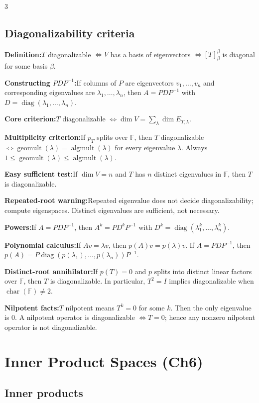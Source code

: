\documentclass[10pt]{article}
\newcommand{\F}{\mathbb{F}}
\newcommand{\diag}{\operatorname{diag}}
\newcommand{\algmult}{\operatorname{algmult}}
\newcommand{\geomult}{\operatorname{geomult}}
\newenvironment{cheatitems}{\par\vspace{-1pt}}{\par\vspace{-1pt}}
\newcommand{\cheatrow}[2]{%
  \par\noindent\textbf{#1:}\nobreak\enspace #2\par
}
\begin{document}
\begin{multicols}{3}
\subsection*{Diagonalizability criteria}
\begin{cheatitems}
\cheatrow{Definition}{$T$ diagonalizable $\iff V$ has a basis of eigenvectors $\iff [T]^\beta_\beta$ is diagonal for some basis $\beta$.}
\cheatrow{Constructing $PDP^{-1}$}{If columns of $P$ are eigenvectors $v_1,\dots,v_n$ and corresponding eigenvalues are $\lambda_1,\dots,\lambda_n$, then $A=PDP^{-1}$ with $D=\diag(\lambda_1,\dots,\lambda_n)$.}
\cheatrow{Core criterion}{$T$ diagonalizable $\iff \dim V=\sum_\lambda \dim E_{T,\lambda}$.}
\cheatrow{Multiplicity criterion}{If $p_T$ splits over $\F$, then $T$ diagonalizable $\iff \geomult(\lambda)=\algmult(\lambda)$ for every eigenvalue $\lambda$. Always $1\le \geomult(\lambda)\le \algmult(\lambda)$.}
\cheatrow{Easy sufficient test}{If $\dim V=n$ and $T$ has $n$ distinct eigenvalues in $\F$, then $T$ is diagonalizable.}
\cheatrow{Repeated-root warning}{Repeated eigenvalue does not decide diagonalizability; compute eigenspaces. Distinct eigenvalues are sufficient, not necessary.}
\cheatrow{Powers}{If $A=PDP^{-1}$, then $A^k=PD^kP^{-1}$ with $D^k=\diag(\lambda_1^k,\dots,\lambda_n^k)$.}
\cheatrow{Polynomial calculus}{If $Av=\lambda v$, then $p(A)v=p(\lambda)v$. If $A=PDP^{-1}$, then $p(A)=P\diag(p(\lambda_1),\dots,p(\lambda_n))P^{-1}$.}
\cheatrow{Distinct-root annihilator}{If $p(T)=0$ and $p$ splits into distinct linear factors over $\F$, then $T$ is diagonalizable. In particular, $T^2=I$ implies diagonalizable when $\operatorname{char}(\F)\neq 2$.}
\cheatrow{Nilpotent facts}{$T$ nilpotent means $T^k=0$ for some $k$. Then the only eigenvalue is $0$. A nilpotent operator is diagonalizable $\iff T=0$; hence any nonzero nilpotent operator is not diagonalizable.}
\end{cheatitems}

\section*{Inner Product Spaces (Ch6)}

\subsection*{Inner products}
\begin{cheatitems}


\end{cheatitems}
\end{multicols}
\end{document}
